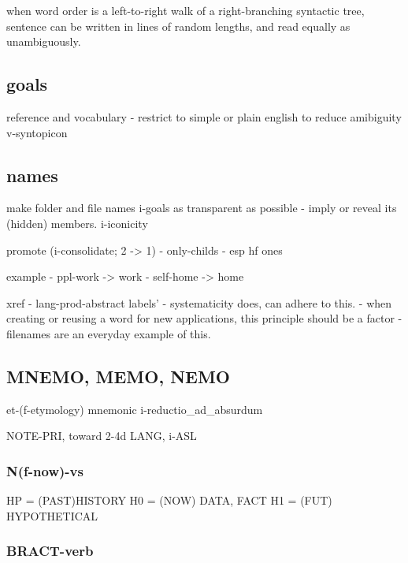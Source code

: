 \documentclass[
]{book}
\begin{document}
when word order is a left-to-right walk of
a right-branching syntactic tree,
sentence can be written in lines of random lengths, and
read equally as unambiguously.

\hypertarget{goals-1}{%
\subsection{goals}\label{goals-1}}

reference and vocabulary
- restrict to simple or plain english to reduce amibiguity
v-syntopicon

\hypertarget{names}{%
\subsection{names}\label{names}}

make folder and file names
i-goals
as transparent as possible
- imply or reveal its (hidden) members.
i-iconicity

promote (i-consolidate; 2 -\textgreater{} 1)
- only-childs
- esp hf ones

example
- ppl-work -\textgreater{} work
- self-home -\textgreater{} home

xref
- lang-prod-abstract labels'
- systematicity does, can adhere to this.
- when creating or reusing a word for new applications, this principle should be a factor
- filenames are an everyday example of this.

\hypertarget{mnemo-memo-nemo}{%
\subsection{MNEMO, MEMO, NEMO}\label{mnemo-memo-nemo}}

et-(f-etymology)
mnemonic
i-reductio\_ad\_absurdum

NOTE-PRI, toward 2-4d LANG, i-ASL

\hypertarget{nf-now-vs}{%
\subsubsection{N(f-now)-vs}\label{nf-now-vs}}

HP = (PAST)HISTORY
H0 = (NOW) DATA, FACT
H1 = (FUT) HYPOTHETICAL

\hypertarget{bract-verb}{%
\subsubsection{BRACT-verb}\label{bract-verb}}
\end{document}
